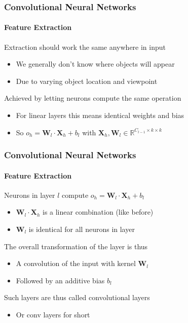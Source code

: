 \documentclass[xetex,professionalfont]{beamer}
\renewcommand\emph[1]{\textcolor{tuwcvl_cvl_blue}{#1}}
\newcommand{\RR}{\mathbb{R}}
\renewcommand{\vec}[1]{\ensuremath{\mathbf{#1}}}
\newcommand{\vW}{\vec{W}}
\newcommand{\vX}{\vec{X}}
\begin{document}
\begin{frame}
\frametitle{Convolutional Neural Networks}
\framesubtitle{Feature Extraction}

Extraction should work the same anywhere in input %
\begin{itemize}
    \item We generally don't know where objects will appear
    \item Due to varying object location and viewpoint %
\end{itemize}

\bigskip

Achieved by letting neurons compute the same operation
\begin{itemize}
    \item For linear layers this means identical weights and bias
    \item So $o_h=\vW_l\cdot\vX_h+b_l$ with $\vX_h,\vW_l\in\RR^{C_{l-1}\times k\times k}$ %
\end{itemize}

\end{frame}


\begin{frame}
\frametitle{Convolutional Neural Networks}
\framesubtitle{Feature Extraction}

Neurons in layer $l$ compute $o_h=\vW_l\cdot\vX_h+b_l$
\begin{itemize}
    \item $\vW_l\cdot\vX_h$ is a linear combination (like before)
    \item $\vW_l$ is identical for all neurons in layer
\end{itemize}

\bigskip

The overall transformation of the layer is thus
\begin{itemize}
     \item A \emph{convolution} of the input with kernel $\vW_l$
     \item Followed by an additive bias $b_l$
\end{itemize}

\bigskip

Such layers are thus called \emph{convolutional layers}
\begin{itemize}
    \item Or \emph{conv layers} for short
\end{itemize}

\end{frame}
\end{document}
